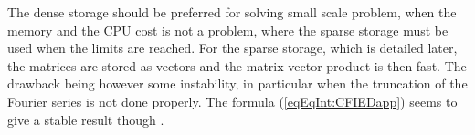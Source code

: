 The dense storage should be preferred for solving small scale problem, when the memory and the CPU cost is not a problem, where the sparse storage must be used when the limits are reached. For the sparse storage, which is detailed later, the matrices are stored as vectors and the matrix-vector product is then fast. The drawback being however some instability, in particular when the truncation of the Fourier series is not done properly. The formula (\ref{eqEqInt:CFIEDapp}) seems to give a stable result though \cite{AntChnRam08}.



%
%

